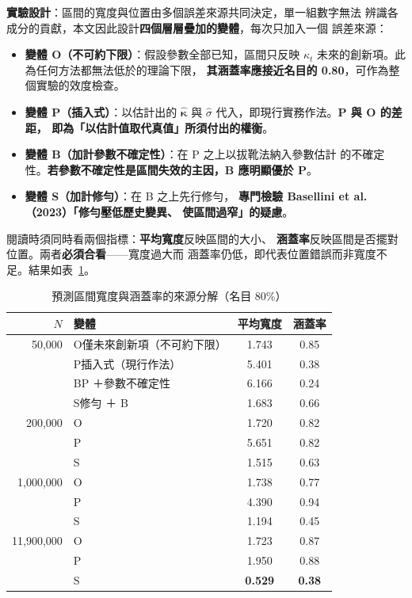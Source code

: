 \documentclass[UTF8, fontset=macnew, a4paper, 12pt]{ctexart}
\begin{document}
\textbf{實驗設計}：區間的寬度與位置由多個誤差來源共同決定，單一組數字無法
辨識各成分的貢獻，本文因此設計\textbf{四個層層疊加的變體}，每次只加入一個
誤差來源：

\begin{itemize}
  \item \textbf{變體 O（不可約下限）}：假設參數全部已知，區間只反映
        $\kappa_t$ 未來的創新項。此為任何方法都無法低於的理論下限，
        \textbf{其涵蓋率應接近名目的 0.80}，可作為整個實驗的效度檢查。
  \item \textbf{變體 P（插入式）}：以估計出的 $\hat{\boldsymbol{\kappa}}$
        與 $\hat\sigma$ 代入，即現行實務作法。\textbf{P 與 O 的差距，
        即為「以估計值取代真值」所須付出的權衡}。
  \item \textbf{變體 B（加計參數不確定性）}：在 P 之上以拔靴法納入參數估計
        的不確定性。\textbf{若參數不確定性是區間失效的主因，B 應明顯優於 P}。
  \item \textbf{變體 S（加計修勻）}：在 B 之上先行修勻，
        \textbf{專門檢驗 Basellini et al.（2023）「修勻壓低歷史變異、
        使區間過窄」的疑慮}。
\end{itemize}

閱讀時須同時看兩個指標：\textbf{平均寬度}反映區間的大小、
\textbf{涵蓋率}反映區間是否擺對位置。兩者\textbf{必須合看}——寬度過大而
涵蓋率仍低，即代表位置錯誤而非寬度不足。結果如表~\ref{tab:decomp}。

\begin{table}[H]
\centering
\caption{預測區間寬度與涵蓋率的來源分解（名目 80\%）}
\small
\begin{tabular}{rlcc}
\toprule
$N$ & 變體 & 平均寬度 & 涵蓋率\\
\midrule
50,000 & O\quad 僅未來創新項（不可約下限） & 1.743 & 0.85\\
       & P\quad 插入式（現行作法） & 5.401 & 0.38\\
       & B\quad P ＋參數不確定性 & 6.166 & 0.24\\
       & S\quad 修勻 ＋ B & 1.683 & 0.66\\
\midrule
200,000 & O & 1.720 & 0.82\\
        & P & 5.651 & 0.82\\
        & S & 1.515 & 0.63\\
\midrule
1,000,000 & O & 1.738 & 0.77\\
          & P & 4.390 & 0.94\\
          & S & 1.194 & 0.45\\
\midrule
11,900,000 & O & 1.723 & 0.87\\
           & P & 1.950 & 0.88\\
           & S & \textbf{0.529} & \textbf{0.38}\\
\bottomrule
\end{tabular}
\label{tab:decomp}
\end{table}
\end{document}
